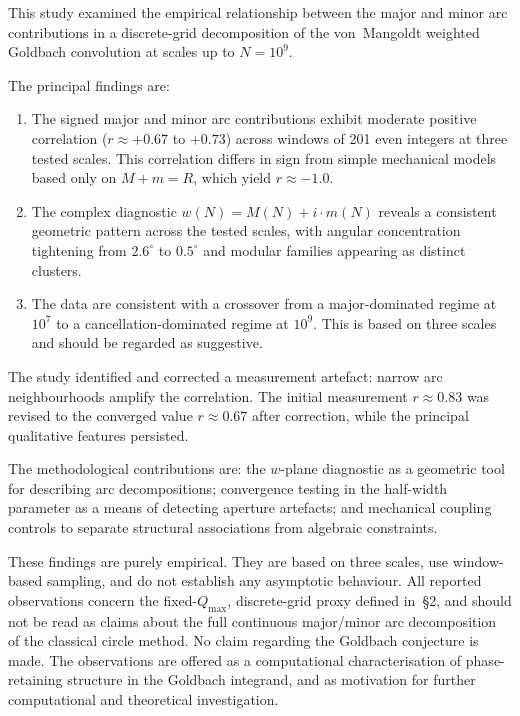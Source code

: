 \documentclass[11pt,a4paper]{article}
\newcommand{\MN}{M(N)}
\newcommand{\mN}{m(N)}
\newcommand{\wN}{w(N)}
\newcommand{\Qmax}{Q_{\max}}
\begin{document}
This study examined the empirical relationship between the major and minor arc contributions in a discrete-grid decomposition of the von~Mangoldt weighted Goldbach convolution at scales up to $N = 10^9$.

The principal findings are:
\begin{enumerate}
\item The signed major and minor arc contributions exhibit moderate positive correlation ($r \approx +0.67$ to $+0.73$) across windows of 201 even integers at three tested scales. This correlation differs in sign from simple mechanical models based only on $M + m = R$, which yield $r \approx -1.0$.
\item The complex diagnostic $\wN = \MN + i \cdot \mN$ reveals a consistent geometric pattern across the tested scales, with angular concentration tightening from $2.6^\circ$ to $0.5^\circ$ and modular families appearing as distinct clusters.
\item The data are consistent with a crossover from a major-dominated regime at $10^7$ to a cancellation-dominated regime at $10^9$. This is based on three scales and should be regarded as suggestive.
\end{enumerate}

The study identified and corrected a measurement artefact: narrow arc neighbourhoods amplify the correlation. The initial measurement $r \approx 0.83$ was revised to the converged value $r \approx 0.67$ after correction, while the principal qualitative features persisted.

The methodological contributions are: the $w$-plane diagnostic as a geometric tool for describing arc decompositions; convergence testing in the half-width parameter as a means of detecting aperture artefacts; and mechanical coupling controls to separate structural associations from algebraic constraints.

These findings are purely empirical. They are based on three scales, use window-based sampling, and do not establish any asymptotic behaviour. All reported observations concern the fixed-$\Qmax$, discrete-grid proxy defined in~\S2, and should not be read as claims about the full continuous major/minor arc decomposition of the classical circle method. No claim regarding the Goldbach conjecture is made. The observations are offered as a computational characterisation of phase-retaining structure in the Goldbach integrand, and as motivation for further computational and theoretical investigation.


\end{document}
